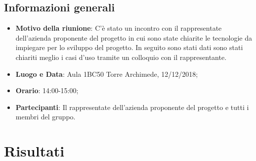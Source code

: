 \documentclass{article}
\begin{document}
    \subsection{Informazioni generali}
    \begin{itemize}
        \item \textbf{Motivo della riunione}: C'è stato un incontro con il rappresentate dell'azienda proponente del progetto in cui sono state chiarite le tecnologie da impiegare per lo sviluppo del progetto. In seguito sono stati dati sono stati chiariti meglio i casi d'uso tramite un colloquio con il rappresentante.
        \item \textbf{Luogo e Data}: Aula 1BC50 Torre Archimede, 12/12/2018;
        \item \textbf{Orario}: 14:00-15:00;
        \item \textbf{Partecipanti}: Il rappresentate dell'azienda proponente del progetto e tutti i membri del gruppo.
    \end{itemize}
    \newpage
    
\section{Risultati}
\end{document}

